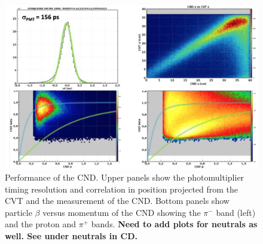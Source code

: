 \documentclass[final,3p,twocolumn]{elsarticle}
\begin{document}
\begin{figure}[htbp!]
\centerline{\includegraphics[width=1.0\columnwidth]{cnd-performance.png}}
\caption{Performance of the CND. Upper panels show the photomultiplier timing resolution and correlation in position projected from the CVT and the measurement of the CND. Bottom panels show particle $\beta$ versus momentum of the CND showing the $\pi^-$ band (left) and the proton and $\pi^+$ bands. {\bf Need to add plots for neutrals as well. See under neutrals in CD.}   }
\label{cnd-performance}
\end{figure}
\end{document}
